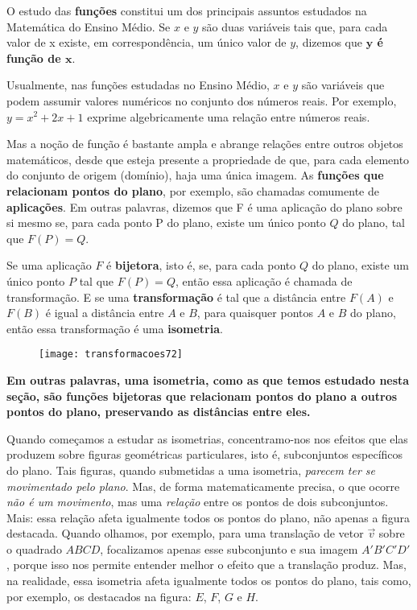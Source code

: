 
O estudo das \textbf{funções} constitui um dos principais assuntos estudados na Matemática do Ensino Médio. Se $x$ e $y$ são duas variáveis tais que, para cada valor de x existe, em correspondência, um único valor de $y$, dizemos que \textbf{$\bm{y}$ é função de $\bm{x}$}. 

Usualmente, nas funções estudadas no Ensino Médio, $x$ e $y$ são variáveis que podem assumir valores numéricos no conjunto dos números reais. Por exemplo, $y = x^2+2x+1$ exprime algebricamente uma relação entre números reais. 

Mas a noção de função é bastante ampla e abrange relações entre outros objetos matemáticos, desde que esteja presente a propriedade de que, para cada elemento do conjunto de origem (domínio), haja uma única imagem. As \textbf{funções que relacionam pontos do plano}, por exemplo, são chamadas comumente de \textbf{aplicações}.  Em outras palavras, dizemos que F é uma aplicação do plano sobre si mesmo se, para cada ponto P do plano, existe um único ponto $Q$ do plano, tal que $F(P) = Q$. 
	
Se uma aplicação $F$ é \textbf{bijetora}, isto é, se, para cada ponto $Q$ do plano, existe um único ponto $P$ tal que $F(P) = Q$, então essa aplicação é chamada de transformação. E se uma \textbf{transformação} é tal que a distância entre $F(A)$ e $F(B)$ é igual a distância entre $A$ e $B$, para quaisquer pontos $A$ e $B$ do plano, então essa transformação é uma \textbf{isometria}. 
 
\begin{figure}[H]
\centering

\texttt{[image: transformacoes72]}
\end{figure}

\textbf{Em outras palavras, uma isometria, como as que temos estudado nesta seção, são funções bijetoras que relacionam pontos do plano a outros pontos do plano, preservando as distâncias entre eles.} 
	
Quando começamos a estudar as isometrias, concentramo-nos nos efeitos que elas produzem sobre figuras geométricas particulares, isto é, subconjuntos específicos do plano. Tais figuras, quando submetidas a uma isometria, \textit{parecem ter se movimentado pelo plano}. Mas, de forma matematicamente precisa, o que ocorre \textit{não é um movimento}, mas uma \textit{relação} entre os pontos de dois subconjuntos. Mais: essa relação afeta igualmente todos os pontos do plano, não apenas a figura destacada. Quando olhamos, por exemplo, para uma translação de vetor $\overrightarrow{v}$ sobre o quadrado $ABCD$, focalizamos apenas esse subconjunto e sua imagem $A'B'C'D'$, porque isso nos permite entender melhor o efeito que a translação produz. Mas, na realidade, essa isometria afeta igualmente todos os pontos do plano, tais como, por exemplo, os destacados na figura: $E$, $F$, $G$ e $H$. 


